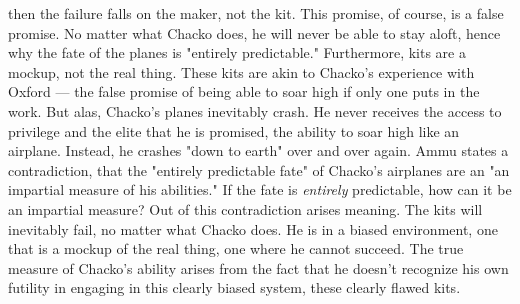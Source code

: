 \documentclass[letterpaper]{article}
\begin{document}
then the failure falls on the maker, not the kit. This promise, of
course, is a false promise. No matter what Chacko does, he will never be
able to stay aloft, hence why the fate of the planes is "entirely
predictable." Furthermore, kits are a mockup, not the real thing. These
kits are akin to Chacko's experience with Oxford --- the false promise
of being able to soar high if only one puts in the work. But alas,
Chacko's planes inevitably crash. He never receives the access to
privilege and the elite that he is promised, the ability to soar high
like an airplane. Instead, he crashes "down to earth" over and over
again. Ammu states a contradiction, that the "entirely predictable fate"
of Chacko's airplanes are an "an impartial measure of his abilities." If
the fate is \emph{entirely} predictable, how can it be an impartial measure?
Out of this contradiction arises meaning. The kits will inevitably fail,
no matter what Chacko does. He is in a biased environment, one that is a
mockup of the real thing, one where he cannot succeed. The true measure
of Chacko's ability arises from the fact that he doesn't recognize his
own futility in engaging in this clearly biased system, these clearly
flawed kits.
\end{document}
